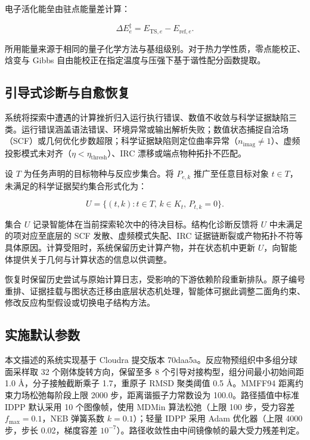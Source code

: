 电子活化能垒由驻点能量差计算：

\begin{equation}\label{eq:methods-14}
\Delta E_e^\ddagger=E_{\mathrm{TS},e}-E_{\mathrm{ref},e}.
\end{equation}

所用能量来源于相同的量子化学方法与基组级别。对于热力学性质，零点能校正、焓变与 Gibbs 自由能校正在指定温度与压强下基于谐性配分函数提取。

\subsection{引导式诊断与自愈恢复}
系统将探索中遭遇的计算挫折归入运行执行错误、数值不收敛与科学证据缺陷三类。运行错误涵盖语法错误、环境异常或输出解析失败；数值状态捕捉自洽场（SCF）或几何优化步数超限；科学证据缺陷则定位曲率异常（$n_{\mathrm{imag}}\ne 1$）、虚频投影模式未对齐（$\eta<\eta_{\mathrm{thresh}}$）、IRC 漂移或端点物种拓扑不匹配。

设 $T$ 为任务声明的目标物种与反应步集合。将 $P_{e,k}$ 推广至任意目标对象 $t\in T$，未满足的科学证据契约集合形式化为：

\begin{equation}\label{eq:methods-15}
U=\{(t,k):t\in T,\, k\in K_t,\, P_{t,k}=0\}.
\end{equation}

集合 $U$ 记录智能体在当前探索轮次中的待决目标。结构化诊断反馈将 $U$ 中未满足的项对应至底层的 SCF 发散、虚频模式失配、IRC 证据链断裂或产物拓扑不符等具体原因。计算受阻时，系统保留历史计算产物，并在状态机中更新 $U$，向智能体提供关于几何与计算状态的信息以供调整。

恢复时保留历史尝试与原始计算日志，受影响的下游依赖阶段重新排队。原子编号重排、证据挂载与图状态迁移由底层状态机处理，智能体可据此调整二面角约束、修改反应构型假设或切换电子结构方法。

\subsection{实施默认参数}
{\small
本文描述的系统实现基于 Cloudra 提交版本 70daa5a。反应物预组织中多组分球面采样取 32 个刚体旋转方向，保留至多 8 个引导对接构型，组分间最小初始间距 1.0 Å，分子接触截断乘子 1.7，重原子 RMSD 聚类阈值 0.5 Å。MMFF94 距离约束力场松弛每阶段上限 2000 步，距离谐振子力常数设为 100.0。路径插值中标准 IDPP 默认采用 10 个图像帧，使用 MDMin 算法松弛（上限 100 步，受力容差 $f_{\max}=0.1$，NEB 弹簧系数 $k=0.1$）；轻量 IDPP 采用 Adam 优化器（上限 4000 步，步长 0.02，梯度容差 $10^{-7}$）。路径收敛性由中间镜像帧的最大受力残差判定。\par}

